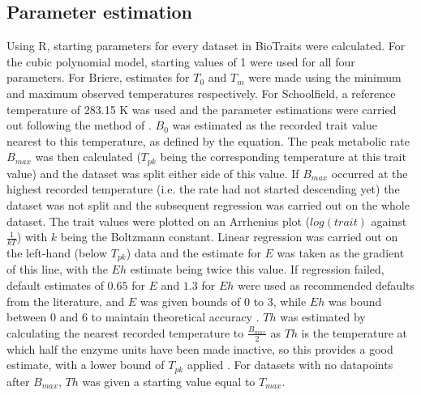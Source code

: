\documentclass[twoside,twocolumn,11pt]{article}
\begin{document}
\subsection{Parameter estimation}
Using R, starting parameters for every dataset in BioTraits were calculated.
For the cubic polynomial model, starting values of 1 were used for all four parameters.
For Briere, estimates for $T_{0}$ and $T_{m}$ were made using
the minimum and maximum observed temperatures respectively. For Schoolfield, a reference temperature of 283.15 K
was used and the parameter estimations were carried out following the method of
\cite{Schoolfield1981}. $B_{0}$ was estimated as the recorded trait value nearest to this temperature, as defined
by the equation. 
The peak metabolic 
rate $B_{max}$ was then calculated ($T_{pk}$ being the corresponding temperature at this trait value) and the dataset 
was split either side of this value. If $B_{max}$ occurred at the highest recorded temperature 
(i.e. the rate had not started descending yet) the dataset was not split and the subsequent regression was carried 
out on the whole dataset. The trait values were plotted on an Arrhenius plot ($log(trait)$ against $\frac{1}{kT}$) 
with $k$ being the Boltzmann constant. Linear 
regression was carried out on the left-hand (below $T_{pk}$) data and the estimate for $E$ was taken as the gradient
of this line, with the $Eh$ estimate being twice this value. If regression failed, default estimates of $0.65$ for $E$
and $1.3$ for $Eh$ were used as recommended defaults from the literature, and $E$ was given bounds of 0 to 3, while $Eh$ 
was bound between 0 and 6 to maintain theoretical accuracy 
\citep{Montoya2012, Dell2011, Allen2006}. $Th$ was estimated by calculating the nearest recorded 
temperature to $\frac{B_{max}}{2}$ as $Th$ is the temperature at which half the enzyme units have been made inactive, so this 
provides a good estimate, with a lower bound of $T_{pk}$ applied 
\citep{Kontopoulos2018}. For datasets with no datapoints after $B_{max}$, $Th$ was given a starting value equal to $T_{max}$. 
\end{document}
